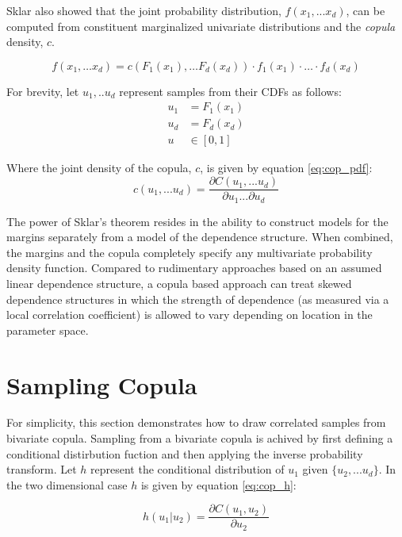 Sklar also showed that the joint probability distribution, $f(x_1, ... x_d)$, can be computed from
constituent marginalized univariate distributions and the \emph{copula} density, $c$.

\begin{equation}
f(x_1,\dots x_d)= c(F_1(x_1),\dots F_d(x_d))\cdot f_1(x_1)\cdot\dots\cdot f_d(x_d)
\label{sklar2}
\end{equation}

For brevity, let $u_1, .. u_d$ represent samples from their CDFs as follows:
\begin{align*} u_1 &= F_1(x_1) \\ u_d &= F_d(x_d) \\ u &\in
[0, 1]
\end{align*}

Where the joint density of the copula, $c$, is given by equation \ref{eq:cop_pdf}:
\begin{equation}
c(u_1, ... u_d) = \frac{\partial C(u_1, ... u_d)}{\partial u_1 ... \partial u_d}
\label{eq:cop_pdf}
\end{equation}

The power of Sklar's theorem resides in the ability to construct
models for the margins separately from a model of the dependence structure.
When combined, the margins and the copula completely
specify any multivariate probability density function.
Compared to rudimentary approaches based on an assumed linear dependence structure,
a copula based approach can treat skewed dependence structures in which the
strength of dependence (as measured via a local correlation coefficient) is allowed
to vary depending on location in the parameter space.

\section*{Sampling Copula}

For simplicity, this section demonstrates how to draw correlated samples from bivariate copula.
Sampling from a bivariate copula is achived by first defining a conditional distirbution fuction and then applying the inverse probability transform.
Let $h$ represent the conditional distribution of $u_1$ given $\{u_2, ... u_d\}$.  In the two dimensional case $h$ is given by equation \ref{eq:cop_h}:

\begin{equation}
h(u_1 | u_2) = \frac{\partial C(u_1, u_2)}{\partial u_2}
\label{eq:cop_h}
\end{equation}

